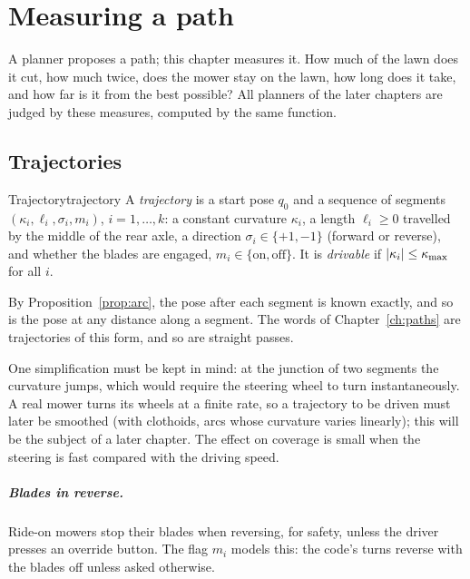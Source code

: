 \chapter{Measuring a path}
\label{ch:measuring}

A planner proposes a path; this chapter measures it. How much of the lawn
does it cut, how much twice, does the mower stay on the lawn, how long does it
take, and how far is it from the best possible? All planners of the later
chapters are judged by these measures, computed by the same function.

\section{Trajectories}

\begin{definition}{Trajectory}{trajectory}
  A \emph{trajectory} is a start pose $q_0$ and a sequence of segments
  $(\kappa_i, \ell_i, \sigma_i, m_i)$, $i = 1, \dots, k$: a constant
  curvature $\kappa_i$, a length $\ell_i \ge 0$ travelled by the middle of
  the rear axle, a direction $\sigma_i \in \{+1, -1\}$ (forward or
  reverse), and whether the blades are engaged, $m_i \in \{\text{on},
  \text{off}\}$. It is \emph{drivable} if $|\kappa_i| \le \kappa_{\max}$ for all
  $i$.
\end{definition}

By Proposition~\ref{prop:arc}, the pose after each segment is known exactly,
and so is the pose at any distance along a segment. The words of
Chapter~\ref{ch:paths} are trajectories of this form, and so are straight
passes.

One simplification must be kept in mind: at the junction of two segments the
curvature jumps, which would require the steering wheel to turn
instantaneously. A real mower turns its wheels at a finite rate, so a
trajectory to be driven must later be smoothed (with clothoids, arcs whose
curvature varies linearly); this will be the subject of a later chapter.
The effect on coverage is small when the steering is fast compared with the
driving speed.

\paragraph{Blades in reverse.}
Ride-on mowers stop their blades when reversing, for safety, unless the
driver presses an override button. The flag $m_i$ models this: the code's
turns reverse with the blades off unless asked otherwise.

